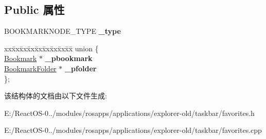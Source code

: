 \subsection*{Public 属性}
\begin{DoxyCompactItemize}
\item 
\mbox{\label{struct_bookmark_node_ae39417be0efd02d5704280f0b3eec656}} 
B\+O\+O\+K\+M\+A\+R\+K\+N\+O\+D\+E\+\_\+\+T\+Y\+PE {\bfseries \+\_\+type}
\item 
\mbox{\label{struct_bookmark_node_acba8d8d69d0599b66ec212f2d747ea00}} 
\begin{tabbing}
xx\=xx\=xx\=xx\=xx\=xx\=xx\=xx\=xx\=\kill
union \{\\
\>\hyperlink{struct_bookmark}{Bookmark} $\ast$ {\bfseries \_pbookmark}\\
\>\hyperlink{struct_bookmark_folder}{BookmarkFolder} $\ast$ {\bfseries \_pfolder}\\
\}; \\

\end{tabbing}\end{DoxyCompactItemize}


该结构体的文档由以下文件生成\+:\begin{DoxyCompactItemize}
\item 
E\+:/\+React\+O\+S-\/0../modules/rosapps/applications/explorer-\/old/taskbar/favorites.\+h\item 
E\+:/\+React\+O\+S-\/0../modules/rosapps/applications/explorer-\/old/taskbar/favorites.\+cpp\end{DoxyCompactItemize}
